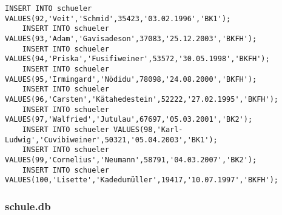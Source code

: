 \begin{lstlisting}[breaklines=True, numbers=none, basicstyle=\tiny, keepspaces=false]
	INSERT INTO schueler VALUES(92,'Veit','Schmid',35423,'03.02.1996','BK1');
	INSERT INTO schueler VALUES(93,'Adam','Gavisadeson',37083,'25.12.2003','BKFH');
	INSERT INTO schueler VALUES(94,'Priska','Fusifiweiner',53572,'30.05.1998','BKFH');
	INSERT INTO schueler VALUES(95,'Irmingard','Nödidu',78098,'24.08.2000','BKFH');
	INSERT INTO schueler VALUES(96,'Carsten','Kätahedestein',52222,'27.02.1995','BKFH');
	INSERT INTO schueler VALUES(97,'Walfried','Jutulau',67697,'05.03.2001','BK2');
	INSERT INTO schueler VALUES(98,'Karl-Ludwig','Cuvibiweiner',50321,'05.04.2003','BK1');
	INSERT INTO schueler VALUES(99,'Cornelius','Neumann',58791,'04.03.2007','BK2');
	INSERT INTO schueler VALUES(100,'Lisette','Kadedumüller',19417,'10.07.1997','BKFH');
\end{lstlisting}
\subsubsection{schule.db}
